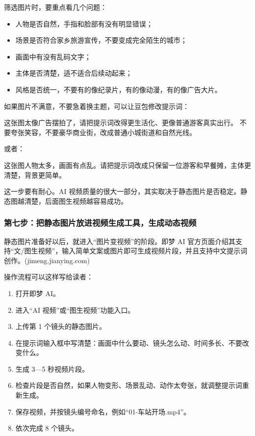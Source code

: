 筛选图片时，要重点看几个问题：
\begin{itemize}
    \item 人物是否自然，手指和脸部有没有明显错误；
    \item 场景是否符合家乡旅游宣传，不要变成完全陌生的城市；
    \item 画面中有没有乱码文字；
    \item 主体是否清楚，适不适合后续动起来；
    \item 风格是否统一，不要有的像纪录片，有的像动漫，有的像广告大片。
\end{itemize}

如果图片不满意，不要急着换主题，可以让豆包修改提示词：

\begin{tcolorbox}[promptbox]
这张图太像广告摆拍了，请把提示词改得更生活化、更像普通游客真实出行。
不要夸张笑容，不要豪华商业街，改成普通小城街道和自然光线。
\end{tcolorbox}

或者：

\begin{tcolorbox}[promptbox]
这张图人物太多，画面有点乱。请把提示词改成只保留一位游客和早餐摊，主体更清楚，背景更简单。
\end{tcolorbox}

这一步要有耐心。AI 视频质量的很大一部分，其实取决于静态图片是否稳定。静态图越清楚，后面图生视频越容易成功。

\subsubsection*{第七步：把静态图片放进视频生成工具，生成动态视频}

静态图片准备好以后，就进入“图片变视频”的阶段。即梦 AI 官方页面介绍其支持“文/图生视频”，输入简单文案或图片即可生成视频片段，并且支持中文提示词创作。(jimeng.jianying.com)

操作流程可以这样写给读者：
\begin{enumerate}
    \item 打开即梦 AI。
    \item 进入“AI 视频”或“图生视频”功能入口。
    \item 上传第 1 个镜头的静态图片。
    \item 在提示词输入框中写清楚：画面中什么要动、镜头怎么动、时间多长、不要改变什么。
    \item 生成 3—5 秒视频片段。
    \item 检查片段是否自然，如果人物变形、场景乱动、动作太夸张，就调整提示词重新生成。
    \item 保存视频，并按镜头编号命名，例如“01-车站开场.mp4”。
    \item 依次完成 8 个镜头。
\end{enumerate}

